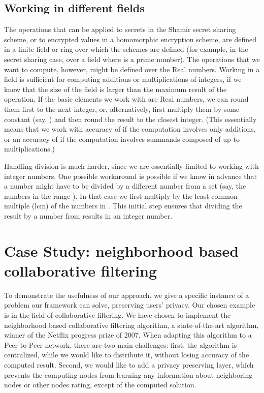 \documentclass[times, 10pt,twocolumn]{article}
\begin{document}
\subsection{Working in different fields}
The operations that can be applied to secrets in the Shamir secret
sharing scheme, or to encrypted values in a homomorphic encryption
scheme, are defined in a finite field or ring over which the schemes
are defined (for example, in the secret sharing case, over a field
 where  is a prime number). The operations that we want to
compute, however, might be defined over the Real numbers.  Working
in a field is sufficient for computing additions or
multiplications of integers, if we know that the size of the field
is larger than the maximum result of the operation. If the basic
elements we work with are Real numbers, we can round them first to
the next integer, or, alternatively, first multiply them by some
constant  (say, ) and then round the result to the
closest integer. (This essentially means that we work with
accuracy of  if the computation involves only additions, or
an accuracy of  if the computation involves summands
composed of up to  multiplications.)

Handling division is much harder, since  we are essentially limited
to working with integer numbers. One possible workaround is
possible if we know in advance that a number  might have to be
divided by a different number from a set  (say, the numbers in
the range ). In that case we first multiply  by the
least common multiple (lcm) of the numbers in . This initial
step ensures that dividing the result by a number from  results
in an integer number.


\section{Case Study: neighborhood based collaborative filtering}
\label{jacobi} To demonstrate the usefulness of our approach, we
give a specific instance of a problem our framework can solve,
preserving users' privacy. Our chosen example is in the field of
collaborative filtering. We have chosen to implement the
neighborhood based collaborative filtering algorithm, a
state-of-the-art algorithm, winner of the Netflix progress prize
of 2007. When adapting this algorithm to a Peer-to-Peer network,
there are two main challenges: first, the algorithm is
centralized, while we would like to distribute it, without losing
accuracy of the computed result. Second, we would like to add a
privacy preserving layer, which prevents the computing nodes from
learning any information about neighboring nodes or other nodes
rating, except of the computed solution.
\end{document}
